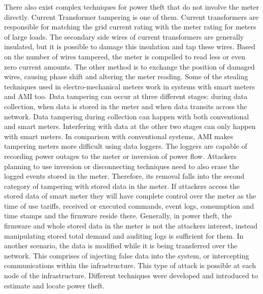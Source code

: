 There also exist complex techniques for power theft that do not involve the meter directly. Current Transformer tampering is one of them. Current transformers are responsible for matching the grid current rating with the meter rating for meters of large loads. The secondary side wires of current transformers are generally insulated, but it is possible to damage this insulation and tap these wires. Based on the number of wires tampered, the meter is compelled to read less or even zero current amounts. The other method is to exchange the position of damaged wires, causing phase shift and altering the meter reading. Some of the stealing techniques used in electro-mechanical meters work in systems with smart meters and AMI too. Data tampering can occur at three different stages: during data collection, when data is stored in the meter and when data transits across the network. Data tampering during collection can happen with both conventional and smart meters. Interfering with data at the other two stages can only happen with smart meters. In comparison with conventional systems, AMI makes tampering meters more difficult using data loggers. The loggers are capable of recording power outages to the meter or inversion of power flow. Attackers planning to use inversion or disconnecting techniques need to also erase the logged events stored in the meter. Therefore, its removal falls into the second category of tampering with stored data in the meter. If attackers access the stored data of smart meter they will have complete control over the meter as the time of use tariffs, received or executed commands, event logs,
consumption and time stamps and the firmware reside there. Generally, in power theft, the firmware and whole stored data in the meter is not the attackers interest, instead manipulating stored total demand and auditing logs is sufficient for them. In another scenario, the data is modified while it is being transferred over the network. This comprises of injecting false data into the system, or intercepting communications within the infrastructure. This type of attack is possible at each node of the infrastructure. Different techniques were developed and introduced to estimate and locate power theft. 
 
